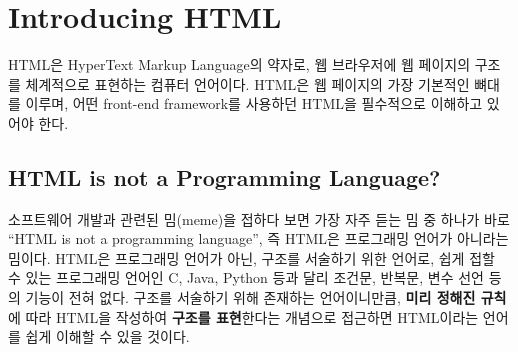 \section{Introducing HTML}\label{sect:introducing-html}

HTML은 HyperText Markup Language의 약자로, 웹 브라우저에 웹 페이지의 구조를 체계적으로 표현하는 컴퓨터 언어이다. HTML은 웹 페이지의 가장 기본적인 뼈대를 이루며, 어떤 front-end framework를 사용하던 HTML을 필수적으로 이해하고 있어야 한다.

\subsection*{HTML is not a Programming Language?}

소프트웨어 개발과 관련된 밈(meme)을 접하다 보면 가장 자주 듣는 밈 중 하나가 바로 ``HTML is not a programming language'', 즉 HTML은 프로그래밍 언어가 아니라는 밈이다. HTML은 프로그래밍 언어가 아닌, 구조를 서술하기 위한 언어로, 쉽게 접할 수 있는 프로그래밍 언어인 C, Java, Python 등과 달리 조건문, 반복문, 변수 선언 등의 기능이 전혀 없다. 구조를 서술하기 위해 존재하는 언어이니만큼, \textbf{미리 정해진 규칙}에 따라 HTML을 작성하여 \textbf{구조를 표현}한다는 개념으로 접근하면 HTML이라는 언어를 쉽게 이해할 수 있을 것이다.

    {}

